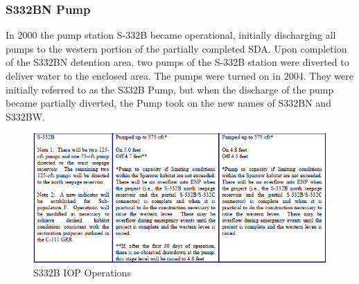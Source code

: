 
\clearpage

\subsubsection{S332BN Pump}
In 2000 the pump station S-332B became operational, initially discharging all pumps to the western portion of the partially completed SDA.
Upon completion of the S332BN detention area, two pumps of the S-332B station were diverted to deliver water to the enclosed area.
The pumps were turned on in 2004. They were initially referred to as the S332B Pump, but when the discharge of the pump became partially diverted, the Pump took on the new names of S332BN and S332BW.

\begin{figure}[!h]
  \begin{center}
  \includegraphics[width=6.5in]{../figs/S332B_IOPops.png}
  \caption{S332B IOP Operations}
  \label{fig:S332BNiop}
  \end{center}
\end{figure}

